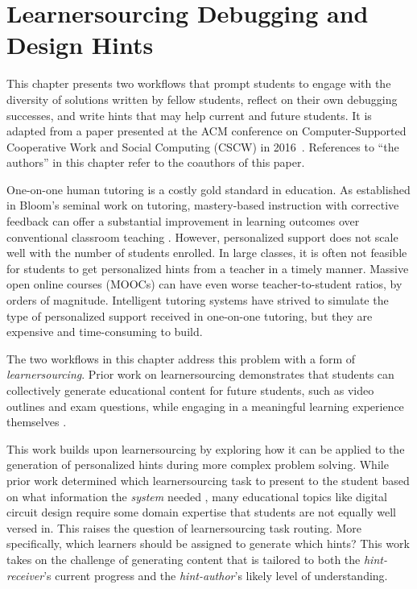\chapter{Learnersourcing Debugging and Design Hints}\label{chapter:classoverflow}

This chapter presents two workflows that prompt students to engage with the diversity of solutions written by fellow students, reflect on their own debugging successes, and write hints that may help current and future students. It is adapted from a paper presented at the ACM conference on
Computer-Supported Cooperative Work and
Social Computing (CSCW) in 2016~\cite{classoverflow}. References to ``the authors'' in this chapter refer to the coauthors of this paper.

One-on-one human tutoring is a costly gold standard in education. As established in Bloom's seminal work on tutoring, mastery-based instruction with corrective feedback can offer a substantial improvement in learning outcomes over conventional classroom teaching \cite{bloom}. However, personalized support does not scale well with the number of students enrolled. In large classes, it is often not feasible for students to get personalized hints from a teacher in a timely manner. Massive open online courses (MOOCs) can have even worse teacher-to-student ratios, by orders of magnitude. Intelligent tutoring systems have strived to simulate the type of personalized support received in one-on-one tutoring, but they are expensive and time-consuming to build. 

The two workflows in this chapter address this problem with a form of {\it learnersourcing}. Prior work on learnersourcing demonstrates that students can collectively generate educational content for future students, such as video outlines and exam questions, while engaging in a meaningful learning experience themselves \cite{kim2013learnersourcing,weir2015,mitros2015}. %

This work builds upon learnersourcing by exploring how it can be applied to the generation of personalized hints during more complex problem solving. While prior work determined which learnersourcing task to present to the student based on what information the {\it system} needed \cite{weir2015}, many educational topics like digital circuit design require some domain expertise that students are not equally well versed in. This raises the question of learnersourcing task routing. More specifically, which learners should be assigned to generate which hints? This work takes on the challenge of generating content that is tailored to both the \textit{hint-receiver}'s current progress and the \textit{hint-author}'s likely level of understanding. 

